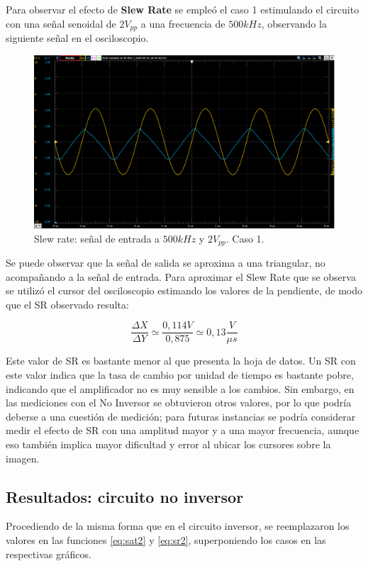 Para observar el efecto de \textbf{Slew Rate} se empleó el caso 1 estimulando el circuito con una señal senoidal de $2V_{pp}$ a una frecuencia de $500kHz$, observando la siguiente señal en el osciloscopio. 

\begin{figure}[H]
	\centering
	\includegraphics[scale=0.3]{./Imagenes/ICaso1SR.png}
	\caption{Slew rate: señal de entrada a $500kHz$ y $2V_{pp}$. Caso 1.}
	\label{fig:circinvcaso1}
\end{figure}

Se puede observar que la señal de salida se aproxima a una triangular, no acompañando a la señal de entrada. Para aproximar el Slew Rate que se observa se utilizó el cursor del osciloscopio estimando los valores de la pendiente, de modo que el SR observado resulta:

 $$\frac{\Delta X}{\Delta Y} \simeq \frac{0,114V}{0,875}\simeq  0,13 \frac{V}{\mu s}$$
 
Este valor de SR es bastante menor al que presenta la hoja de datos. Un SR con este valor indica que la tasa de cambio por unidad de tiempo es bastante pobre, indicando que el amplificador no es muy sensible a los cambios. Sin embargo, en las mediciones con el No Inversor se obtuvieron otros valores, por lo que podría deberse a una cuestión de medición; para futuras instancias se podría considerar medir el efecto de SR con una amplitud mayor y a una mayor frecuencia, aunque eso también implica mayor dificultad y error al ubicar los cursores sobre la imagen. 

\subsection{Resultados: circuito no inversor}

Procediendo de la misma forma que en el circuito inversor, se reemplazaron los valores en las funciones \ref{eq:sat2} y \ref{eq:sr2}, superponiendo los casos en las respectivas gráficos. 

